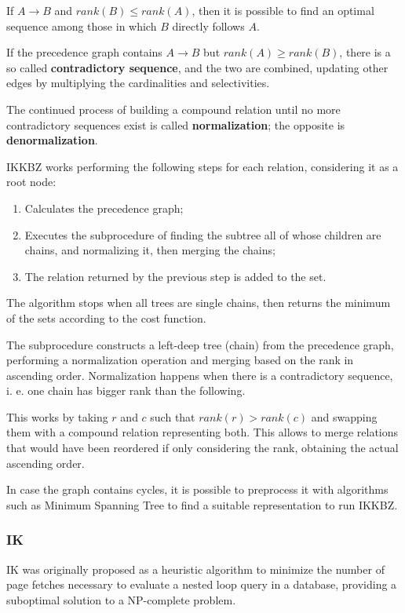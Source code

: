 If $A \rightarrow B$ and $rank(B) \leq rank(A)$, then it is possible to find an optimal sequence among those in which $B$ directly follows $A$.

If the precedence graph contains $A \rightarrow B$ but $rank(A) \geq rank(B)$, there is a so called \textbf{contradictory sequence}, and the two are combined, updating other edges by multiplying the cardinalities and selectivities. 

The continued process of building a compound relation until no more contradictory sequences exist is called \textbf{normalization}; the opposite is \textbf{denormalization}.

IKKBZ works performing the following steps for each relation, considering it as a root node:
\begin{enumerate}
	\item Calculates the precedence graph;
	\item Executes the subprocedure of finding the subtree all of whose children are chains, and normalizing it, then merging the chains;
	\item The relation returned by the previous step is added to the set.
\end{enumerate}
The algorithm stops when all trees are single chains, then returns the minimum of the sets according to the cost function.

The subprocedure constructs a left-deep tree (chain) from the precedence graph, performing a normalization operation and merging based on the rank in ascending order. Normalization happens when there is a contradictory sequence, i. e. one chain has bigger rank than the following.

This works by taking $r$ and $c$ such that $rank(r) > rank(c)$ and swapping them with a compound relation representing both. This allows to merge relations that would have been reordered if only considering the rank, obtaining the actual ascending order.

In case the graph contains cycles, it is possible to preprocess it with algorithms such as Minimum Spanning Tree to find a suitable representation to run IKKBZ.

\subsubsection{IK}
IK was originally proposed as a heuristic algorithm to minimize the number of page fetches necessary to evaluate a nested loop query in a database, providing a suboptimal solution to a NP-complete problem. 

